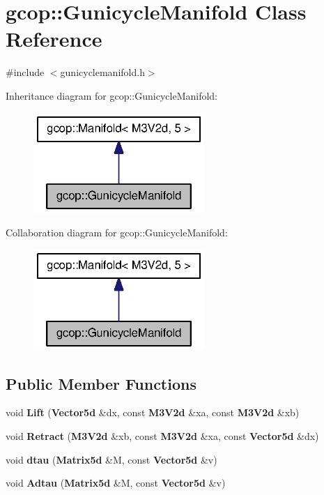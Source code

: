 \section{gcop\-:\-:\-Gunicycle\-Manifold \-Class \-Reference}
\label{classgcop_1_1GunicycleManifold}


{\ttfamily \#include $<$gunicyclemanifold.\-h$>$}



\-Inheritance diagram for gcop\-:\-:\-Gunicycle\-Manifold\-:\nopagebreak
\begin{figure}[H]
\begin{center}
\leavevmode
\includegraphics[width=184pt]{classgcop_1_1GunicycleManifold__inherit__graph}
\end{center}
\end{figure}


\-Collaboration diagram for gcop\-:\-:\-Gunicycle\-Manifold\-:\nopagebreak
\begin{figure}[H]
\begin{center}
\leavevmode
\includegraphics[width=184pt]{classgcop_1_1GunicycleManifold__coll__graph}
\end{center}
\end{figure}
\subsection*{\-Public \-Member \-Functions}
\begin{DoxyCompactItemize}
\item 
void {\bf \-Lift} ({\bf \-Vector5d} \&dx, const {\bf \-M3\-V2d} \&xa, const {\bf \-M3\-V2d} \&xb)
\item 
void {\bf \-Retract} ({\bf \-M3\-V2d} \&xb, const {\bf \-M3\-V2d} \&xa, const {\bf \-Vector5d} \&dx)
\item 
void {\bf dtau} ({\bf \-Matrix5d} \&\-M, const {\bf \-Vector5d} \&v)
\item 
void {\bf \-Adtau} ({\bf \-Matrix5d} \&\-M, const {\bf \-Vector5d} \&v)
\end{DoxyCompactItemize}

